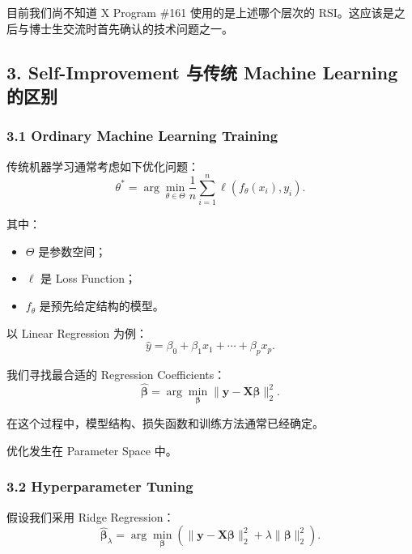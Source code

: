 目前我们尚不知道 X Program \#161 使用的是上述哪个层次的 RSI。这应该是之后与博士生交流时首先确认的技术问题之一。

\hypertarget{part-1-03-0001-self-improvement-ux4e0eux4f20ux7edf-machine-learning-ux7684ux533aux522b}{%
\subsection{3. Self-Improvement 与传统 Machine Learning 的区别}\label{part-1-03-0001-self-improvement-ux4e0eux4f20ux7edf-machine-learning-ux7684ux533aux522b}}

\hypertarget{part-1-03-0001-ordinary-machine-learning-training}{%
\subsubsection{3.1 Ordinary Machine Learning Training}\label{part-1-03-0001-ordinary-machine-learning-training}}

传统机器学习通常考虑如下优化问题：
\[\theta^*
=
\arg\min_{\theta\in\Theta}
\frac{1}{n}
\sum_{i=1}^{n}
\ell(f_\theta(x_i),y_i).\]

其中：

\begin{itemize}
\tightlist
\item
  \(\Theta\) 是参数空间；
\item
  \(\ell\) 是 Loss Function；
\item
  \(f_\theta\) 是预先给定结构的模型。
\end{itemize}

以 Linear Regression 为例：
\[\hat y=\beta_0+\beta_1x_1+\cdots+\beta_px_p.\]

我们寻找最合适的 Regression Coefficients：
\[\hat{\boldsymbol\beta}
=
\arg\min_{\boldsymbol\beta}
\|\mathbf y-\mathbf X\boldsymbol\beta\|_2^2.\]

在这个过程中，模型结构、损失函数和训练方法通常已经确定。

优化发生在 Parameter Space 中。

\hypertarget{part-1-03-0001-hyperparameter-tuning}{%
\subsubsection{3.2 Hyperparameter Tuning}\label{part-1-03-0001-hyperparameter-tuning}}

假设我们采用 Ridge Regression：
\[\hat{\boldsymbol\beta}_{\lambda}
=
\arg\min_{\boldsymbol\beta}
\left(
\|\mathbf y-\mathbf X\boldsymbol\beta\|_2^2
+
\lambda\|\boldsymbol\beta\|_2^2
\right).\]

